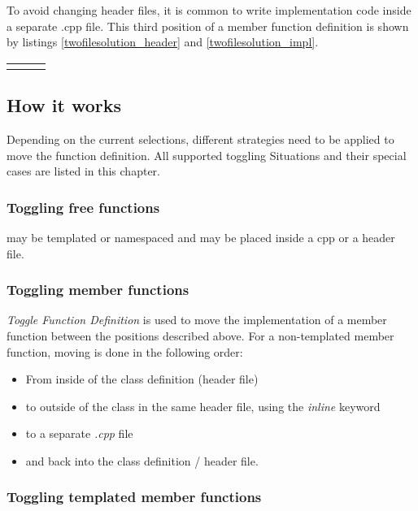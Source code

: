 To avoid changing header files,  it is common to
write implementation code inside a separate .cpp file. This third position of a
member function definition is shown by listings \ref{twofilesolution_header} and
\ref{twofilesolution_impl}.

\begin{tabular}{p{5cm}p{.4cm}p{5cm}}

& & 

\end{tabular}

\subsection{How it works}

Depending on the current selections, different strategies need to be applied to 
move the function definition. All supported toggling Situations and their 
special cases are listed in this chapter.

\subsubsection{Toggling free functions}
may be templated or namespaced and may be placed inside a cpp or a header file.

\subsubsection{Toggling member functions}

\textit{Toggle Function Definition} is used to move the implementation of a 
member function between the positions described above. For a non-templated 
member function, moving is done in the following order:

\begin{itemize}
 \item From inside of the class definition (header file)
 \item to outside of the class in the same header file, using the
\textit{inline} keyword
 \item to a separate \textit{.cpp} file
 \item and back into the class definition / header file.
\end{itemize}

\subsubsection{Toggling templated member functions}

